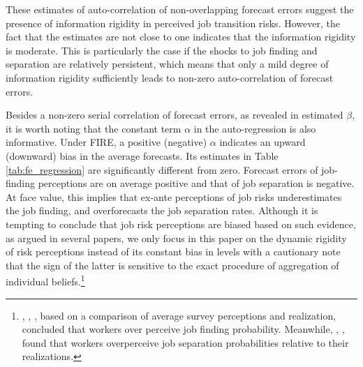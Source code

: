 These estimates of auto-correlation of non-overlapping forecast errors suggest the presence of information rigidity in perceived job transition risks. However, the fact that the estimates are not close to one indicates that the information rigidity is moderate. This is particularly the case if the shocks to job finding and separation are relatively persistent, which means that only a mild degree of information rigidity sufficiently leads to non-zero auto-correlation of forecast errors. 

Besides a non-zero serial correlation of forecast errors, as revealed in estimated $\beta$, it is worth noting that the constant term $\alpha$ in the auto-regression is also informative. Under FIRE, a positive (negative) $\alpha$ indicates an upward (downward) bias in the average forecasts. Its estimates in Table \ref{tab:fe_regression} are significantly different from zero. Forecast errors of job-finding perceptions are on average positive and that of job separation is negative. At face value, this implies that ex-ante perceptions of job risks underestimates the job finding, and overforecasts the job separation rates. Although it is tempting to conclude that job risk perceptions are biased based on such evidence, as argued in several papers, we only focus in this paper on the dynamic rigidity of risk perceptions instead of its constant bias in levels with a cautionary note that the sign of the latter is sensitive to the exact procedure of aggregation of individual beliefs.\footnote{\cite{arni2013s}, \cite{conlon2018labor}, \cite{mueller2021job}, based on a comparison of average survey perceptions and realization, concluded that workers over perceive job finding probability. Meanwhile, \cite{stephens2004job}, \cite{dickerson2012fears}, \cite{balleer2023biased} found that workers overperceive job separation probabilities relative to their realizations.} 